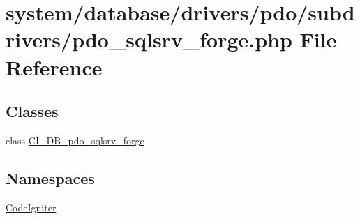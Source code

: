 \hypertarget{pdo__sqlsrv__forge_8php}{}\section{system/database/drivers/pdo/subdrivers/pdo\+\_\+sqlsrv\+\_\+forge.php File Reference}
\label{pdo__sqlsrv__forge_8php}
\subsection*{Classes}
\begin{DoxyCompactItemize}
\item 
class \mbox{\hyperlink{class_c_i___d_b__pdo__sqlsrv__forge}{C\+I\+\_\+\+D\+B\+\_\+pdo\+\_\+sqlsrv\+\_\+forge}}
\end{DoxyCompactItemize}
\subsection*{Namespaces}
\begin{DoxyCompactItemize}
\item 
 \mbox{\hyperlink{namespace_code_igniter}{Code\+Igniter}}
\end{DoxyCompactItemize}
